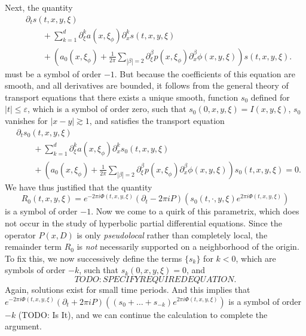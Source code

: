 Next, the quantity
%
\begin{align*}
    &\partial_t s(t,x,y,\xi)\\
    &\quad\quad + \sum_{k = 1}^d \partial_\xi^k a(x,\xi_\phi) \partial_x^k s(t,x,y,\xi)\\
    &\quad\quad + \left( a_0(x,\xi_\phi) + \frac{1}{2 \pi} \sum_{|\beta| = 2} \partial_\xi^\beta p(x,\xi_\phi) \partial_x^\beta \phi(x,y,\xi) \right) s(t,x,y,\xi).
\end{align*}
%
must be a symbol of order $-1$. But because the coefficients of this equation are smooth, and all derivatives are bounded, it follows from the general theory of transport equations that there exists a unique smooth, function $s_0$ defined for $|t| \leq \varepsilon$, which is a symbol of order zero, such that $s_0(0,x,y,\xi) = I(x,y,\xi)$, $s_0$ vanishes for $|x - y| \gtrsim 1$, and satisfies the transport equation
%
\begin{align*}
    &\partial_t s_0(t,x,y,\xi)\\
    &\quad\quad + \sum_{k = 1}^d \partial_\xi^k a(x,\xi_\phi) \partial_x^k s_0(t,x,y,\xi)\\
    &\quad\quad + \left( a_0(x,\xi_\phi) + \frac{1}{2 \pi} \sum_{|\beta| = 2} \partial_\xi^\beta p(x,\xi_\phi) \partial_x^\beta \phi(x,y,\xi) \right) s_0(t,x,y,\xi) = 0.
\end{align*}
%
We have thus justified that the quantity
%
\[ R_0(t,x,y,\xi) = e^{-2 \pi i \Phi(t,x,y,\xi)} (\partial_t - 2 \pi i P)(s_0(t,\cdot,y,\xi) e^{2 \pi i \Phi(t,x,y,\xi)}) \]
%
is a symbol of order $-1$. Now we come to a quirk of this parametrix, which does not occur in the study of hyperbolic partial differential equations. Since the operator $P(x,D)$ is only \emph{pseudolocal} rather than completely local, the remainder term $R_0$ is \emph{not} necessarily supported on a neighborhood of the origin. To fix this, we now successively define the terms $\{ s_k \}$ for $k < 0$, which are symbols of order $-k$, such that $s_k(0,x,y,\xi) = 0$, and
%
\[ TODO: SPECIFY REQUIRED EQUATION. \]
%
Again, solutions exist for small time periods. And this implies that $e^{-2 \pi i \Phi(t,x,y,\xi)} (\partial_t + 2 \pi i P)((s_0 + \dots + s_{-k}) e^{2 \pi i \Phi(t,x,y,\xi)})$ is a symbol of order $-k$ (TODO: Is It), and we can continue the calculation to complete the argument.


